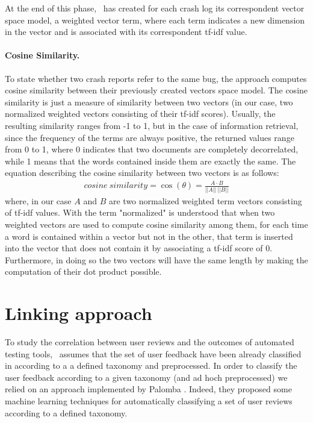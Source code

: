 At the end of this phase, \toolname\ has created for each crash log its correspondent vector space model, \ie a weighted vector term, where each term indicates a new dimension in the vector and is associated with its correspondent tf-idf value. 


\paragraph{Cosine Similarity.}
\label{sec:cosine_similarity}
To state whether two crash reports refer to the same bug, the approach computes cosine similarity between their previously created vectors space model. 
The cosine similarity is just a measure of similarity between two vectors \cite{cosine} (in our case, two normalized weighted vectors consisting of their tf-idf scores).
Usually, the resulting similarity ranges from -1 to 1, but in the case of information retrieval, since the frequency of the terms are always positive, the returned values range from 0 to 1, where 0 indicates that two documents are completely decorrelated, while 1 means that the words contained inside them are exactly the same.  
The equation describing the cosine similarity between two vectors is as follows: 
\begin{align*}
cosine\:similarity = \cos({\theta}) = \frac{A\cdot{B}}{||A||\:||B||}
\end{align*}
where, in our case $A$ and $B$ are two normalized weighted term vectors consisting of tf-idf values. 
With the term "normalized" is understood that when two weighted vectors are used to compute cosine similarity among them, for each time a word is contained within a vector but not in the other, that term is inserted into the vector that does not contain it by associating a tf-idf score of 0. Furthermore, in doing so the two vectors will have the same length by making the computation of their dot product possible. 



\section{Linking approach}
\label{approach:linking}
\label{par: infusa}
To study the correlation between user reviews and the outcomes of automated testing tools, \toolname\ assumes that the set of user feedback have been already classified in according to a a defined taxonomy and preprocessed.
In order to classify the user feedback according to a given taxonomy (and ad hoch preprocessed) we relied on an approach implemented by Palomba \etal \cite{Palomba2017}. 
Indeed, they proposed some machine learning techniques for automatically classifying a set of user reviews according to a defined taxonomy. 

